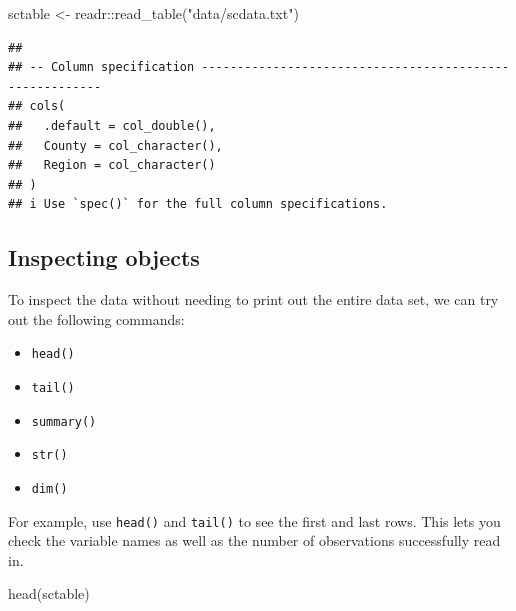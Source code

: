 \documentclass[
]{book}
\newenvironment{Shaded}{\begin{snugshade}}{\end{snugshade}}
\newcommand{\FunctionTok}[1]{\textcolor[rgb]{0.00,0.00,0.00}{#1}}
\newcommand{\NormalTok}[1]{#1}
\newcommand{\OtherTok}[1]{\textcolor[rgb]{0.56,0.35,0.01}{#1}}
\newcommand{\SpecialCharTok}[1]{\textcolor[rgb]{0.00,0.00,0.00}{#1}}
\newcommand{\StringTok}[1]{\textcolor[rgb]{0.31,0.60,0.02}{#1}}
\providecommand{\tightlist}{%
  \setlength{\itemsep}{0pt}\setlength{\parskip}{0pt}}
\begin{document}
\begin{Shaded}
\begin{Highlighting}[]
\NormalTok{sctable }\OtherTok{\textless{}{-}}\NormalTok{ readr}\SpecialCharTok{::}\FunctionTok{read\_table}\NormalTok{(}\StringTok{"data/scdata.txt"}\NormalTok{)}
\end{Highlighting}
\end{Shaded}

\begin{verbatim}
## 
## -- Column specification --------------------------------------------------------
## cols(
##   .default = col_double(),
##   County = col_character(),
##   Region = col_character()
## )
## i Use `spec()` for the full column specifications.
\end{verbatim}

\hypertarget{inspecting-objects}{%
\subsection*{Inspecting objects}\label{inspecting-objects}}

To inspect the data without needing to print out the entire data set, we can try out the following commands:

\begin{itemize}
\tightlist
\item
  \texttt{head()}
\item
  \texttt{tail()}
\item
  \texttt{summary()}
\item
  \texttt{str()}
\item
  \texttt{dim()}
\end{itemize}

For example, use \texttt{head()} and \texttt{tail()} to see the first and last rows. This lets you check the variable names as well as the number of observations successfully read in.

\begin{Shaded}
\begin{Highlighting}[]
\FunctionTok{head}\NormalTok{(sctable)}
\end{Highlighting}
\end{Shaded}
\end{document}
